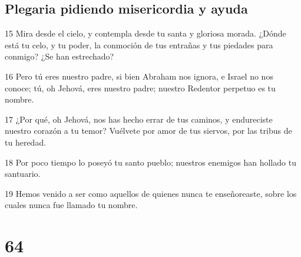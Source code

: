\section*{Plegaria pidiendo misericordia y ayuda}

\par 15 Mira desde el cielo, y contempla desde tu santa y gloriosa morada. ¿Dónde está tu celo, y tu poder, la conmoción de tus entrañas y tus piedades para conmigo? ¿Se han estrechado?
\par 16 Pero tú eres nuestro padre, si bien Abraham nos ignora, e Israel no nos conoce; tú, oh Jehová, eres nuestro padre; nuestro Redentor perpetuo es tu nombre.
\par 17 ¿Por qué, oh Jehová, nos has hecho errar de tus caminos, y endureciste nuestro corazón a tu temor? Vuélvete por amor de tus siervos, por las tribus de tu heredad.
\par 18 Por poco tiempo lo poseyó tu santo pueblo; nuestros enemigos han hollado tu santuario.
\par 19 Hemos venido a ser como aquellos de quienes nunca te enseñoreaste, sobre los cuales nunca fue llamado tu nombre.

\chapter{64}

